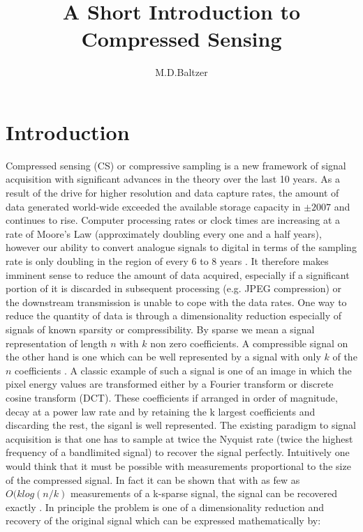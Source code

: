 \documentclass[11pt,twoside,a4paper]{article}
\title{A Short Introduction to Compressed Sensing}
\author{M.D.Baltzer}
\begin{document}
\maketitle




\section{Introduction}
Compressed sensing (CS) or compressive sampling is a new framework of signal acquisition with significant advances in the theory over the last 10 years. As a result of the drive for higher resolution and data capture rates, the amount of data generated world-wide exceeded the available storage capacity in $\pm2007$ \cite{RB} and continues to rise. Computer processing rates or clock times are increasing at a rate of Moore’s Law (approximately doubling every one and a half years), however our ability to convert analogue signals to digital in terms of the sampling rate is only doubling in the region of every 6 to 8 years \cite{RB}. It therefore makes imminent sense to reduce the amount of data acquired, especially if a significant portion of it is discarded in subsequent processing (e.g. JPEG compression) or the downstream transmission is unable to cope with the data rates. One way to reduce the quantity of data is through a dimensionality reduction especially of signals of known sparsity or compressibility. By sparse we mean a signal representation of length $n$ with $k$ non zero coefficients. A compressible signal on the other hand is one which can be well represented by a signal with only $k$ of the $n$ coefficients \cite{GK}. A classic example of such a signal is one of an image in which the pixel energy values are transformed either by a Fourier transform or discrete cosine transform (DCT). These coefficients if arranged in order of magnitude, decay at a power law rate and by retaining the k largest coefficients and discarding the rest, the siganl is well represented. The existing paradigm to signal acquisition is that one has to sample at twice the Nyquist rate (twice the highest frequency of a bandlimited signal) to recover the signal perfectly. Intuitively one would think that it must be possible with measurements proportional to the size of the compressed signal. In fact it can be shown that with as few as $O(klog(n/k)$ measurements of a k-sparse signal, the signal can be recovered exactly \cite{GK}. In principle the problem is one of a dimensionality reduction and recovery of the original signal which can be expressed mathematically by:
\end{document}
